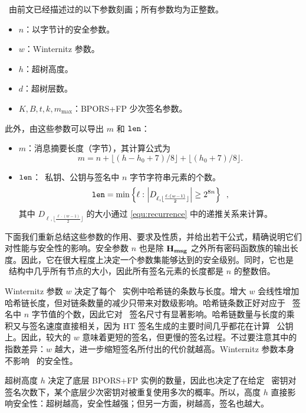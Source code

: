 \SPHINCSA\ 由前文已经描述过的以下参数刻画；所有参数均为正整数。

\begin{itemize}

\item $n$：以字节计的安全参数。

\item $w$：Winternitz 参数。

\item $h$：超树高度。

\item $d$：超树层数。

\item $K,B,t,k,m_{\max}$：BPORS+FP 少次签名参数。

\end{itemize}

此外，由这些参数可以导出 $m$ 和 $\mathtt{len}$：
\begin{itemize}
    \item $ m $：消息摘要长度（字节），其计算公式为
    $$m=n+\lfloor(h-h_0+7)/8\rfloor+\lfloor(h_0+7)/8\rfloor.$$
    \item $\mathtt{len}$：\WOTSCS\ 私钥、公钥与签名中 $n$ 字节字符串元素的个数。
    $$
    \mathtt{len} = \min \left\{ \ell : \left| D_{\ell, \lfloor \frac{\ell \cdot (w-1)}{2} \rfloor} \right| \geq 2^{8n} \right\} \enspace,
    $$
    其中 $D_{\ell, \lfloor \frac{\ell \cdot (w-1)}{2} \rfloor}$ 的大小通过 \cref{equ:recurrence} 中的递推关系来计算。
\end{itemize}

下面我们重新总结这些参数的作用、要求及性质，并给出若干公式，精确说明它们对性能与安全性的影响。安全参数 $n$ 也是除 $\mathbf{H_{msg}}$ 之外所有密码函数族的输出长度。因此，它在很大程度上决定一个参数集能够达到的安全级别。同时，它也是 \SPHINCSA\ 结构中几乎所有节点的大小，因此所有签名元素的长度都是 $n$ 的整数倍。

Winternitz 参数 $w$ 决定了每个 \WOTSCS\ 实例中哈希链的条数与长度。增大 $w$ 会线性增加哈希链长度，但对链条数量的减少只带来对数级影响。哈希链条数正好对应于 \WOTSCS\ 签名中 $n$ 字节值的个数，因此它对 \SPHINCSA\ 签名尺寸有显著影响。哈希链数量与长度的乘积又与签名速度直接相关，因为 HT 签名生成的主要时间几乎都花在计算 \WOTSCS\ 公钥上。因此，较大的 $w$ 意味着更短的签名，但更慢的签名过程。不过要注意其中的指数差异：$w$ 越大，进一步缩短签名所付出的代价就越高。Winternitz 参数本身不影响 \SPHINCSA\ 的安全性。

超树高度 $h$ 决定了底层 BPORS+FP 实例的数量，因此也决定了在给定 \SPHINCSA\ 密钥对签名次数下，某个底层少次密钥对被重复使用多次的概率。所以，高度 $h$ 直接影响安全性：超树越高，安全性越强；但另一方面，树越高，签名也越大。

